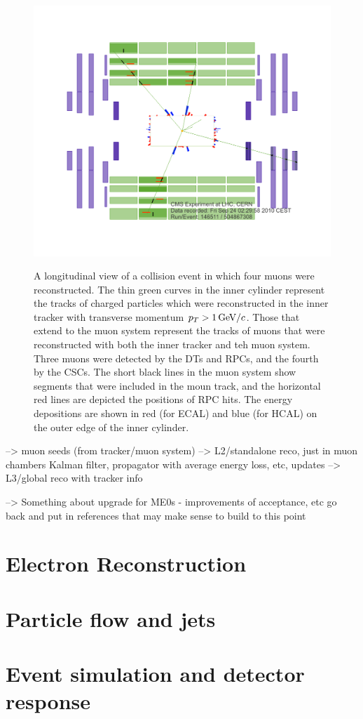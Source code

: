 \begin{figure}[!Hh]
       \centering
       \includegraphics[scale=0.4]{Figures/pictures_r_z_4muon_event_diff_colors_1.png} \\
       \caption[An example of a four muon event in CMS]{A longitudinal view of a collision event in which four muons were reconstructed.  The thin green curves in the inner cylinder represent the tracks of charged particles which were reconstructed in the inner tracker with transverse momentum $p_T > 1\,\text{Ge\hspace{-.08em}V}/c$.  Those that extend to the muon system represent the tracks of muons that were reconstructed with both the inner tracker and teh muon system.  Three muons were detected by the DTs and RPCs, and the fourth by the CSCs.  The short black lines in the muon system show segments that were included in the moun track, and the horizontal red lines are depicted the positions of RPC hits.  The energy depositions are shown in red (for ECAL) and blue (for HCAL) on the outer edge of the inner cylinder.~\cite{Chatrchyan:2012xi}}
\label{figapp:ExampleEvent}
\end{figure}


--> muon seeds (from tracker/muon system)
--> L2/standalone reco, just in muon chambers  Kalman filter, propagator with average energy loss, etc, updates
--> L3/global reco with tracker info

--> Something about upgrade for ME0s - improvements of acceptance, etc  go back and put in references that may make sense to build to this point

\section{Electron Reconstruction}
\label{elereco}

\section{Particle flow and jets}
\label{pflow}



\section{Event simulation and detector response}
\label{simulation}
